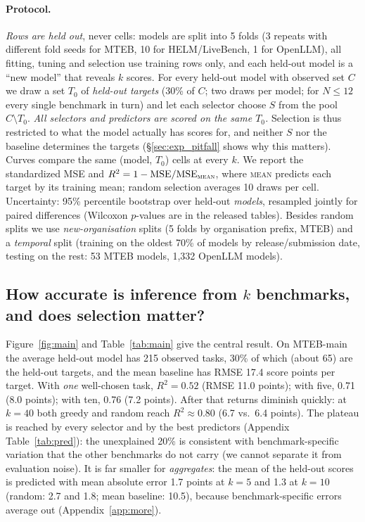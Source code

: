 \paragraph{Protocol.}
\emph{Rows are held out}, never cells: models are split into 5 folds (3 repeats with different fold seeds for MTEB, 10 for HELM/LiveBench, 1 for OpenLLM), all fitting, tuning and selection use training rows only, and each held-out model is a ``new model'' that reveals $k$ scores. For every held-out model with observed set $C$ we draw a set $T_0$ of \emph{held-out targets} (30\% of $C$; two draws per model; for $N\le12$ every single benchmark in turn) and let each selector choose $S$ from the pool $C\setminus T_0$. \emph{All selectors and predictors are scored on the same $T_0$.} Selection is thus restricted to what the model actually has scores for, and neither $S$ nor the baseline determines the targets (\S\ref{sec:exp_pitfall} shows why this matters). Curves compare the same (model, $T_0$) cells at every $k$. We report the standardized MSE and $R^2=1-\mathrm{MSE}/\mathrm{MSE}_{\textsc{mean}}$, where \textsc{mean} predicts each target by its training mean; random selection averages 10 draws per cell. Uncertainty: 95\% percentile bootstrap over held-out \emph{models}, resampled jointly for paired differences (Wilcoxon $p$-values are in the released tables). Besides random splits we use \emph{new-organisation} splits (5 folds by organisation prefix, MTEB) and a \emph{temporal} split (training on the oldest 70\% of models by release/submission date, testing on the rest: 53 MTEB models, 1,332 OpenLLM models).

\subsection{How accurate is inference from $k$ benchmarks, and does selection matter?}
\label{sec:exp_main}
Figure~\ref{fig:main} and Table~\ref{tab:main} give the central result. On MTEB-main the average held-out model has 215 observed tasks, 30\% of which (about 65) are the held-out targets, and the mean baseline has RMSE 17.4 score points per target. With \emph{one} well-chosen task, $R^2=0.52$ (RMSE 11.0 points); with five, 0.71 (8.0 points); with ten, 0.76 (7.2 points). After that returns diminish quickly: at $k=40$ both greedy and random reach $R^2\approx0.80$ (6.7 vs.\ 6.4 points). The plateau is reached by every selector and by the best predictors (Appendix Table~\ref{tab:pred}): the unexplained 20\% is consistent with benchmark-specific variation that the other benchmarks do not carry (we cannot separate it from evaluation noise). It is far smaller for \emph{aggregates}: the mean of the held-out scores is predicted with mean absolute error 1.7 points at $k=5$ and 1.3 at $k=10$ (random: 2.7 and 1.8; mean baseline: 10.5), because benchmark-specific errors average out (Appendix~\ref{app:more}).

